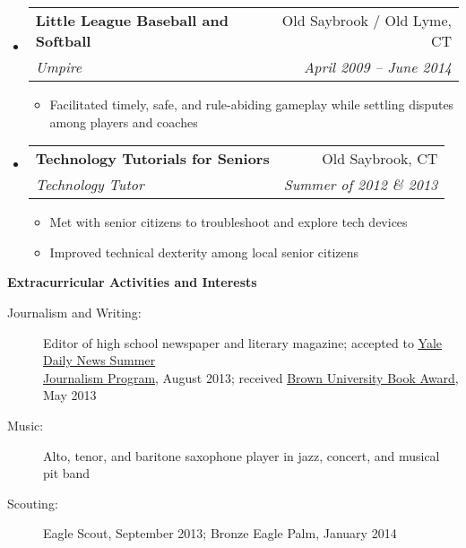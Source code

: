 \documentclass[letterpaper,10.6pt]{article}
\makeatletter
\newcommand{\resitem}[1]{\item #1 \vspace{-2pt}}
\newcommand{\resheading}[1]{{\large \colorbox{mygrey}{\begin{minipage}{\textwidth}{\textbf{#1 \vphantom{p\^{E}}}}\end{minipage}}}}
\newcommand{\ressubheading}[4]{
\begin{tabular*}{6.8in}{l@{\extracolsep{\fill}}r}
		\textbf{#1} & #2 \\
		\emph{#3} & \emph{#4} \\
\end{tabular*}\vspace{-6pt}}
\makeatother
\begin{document}
\begin{itemize}[leftmargin=*]
		\item[]
		\ressubheading{Little League Baseball and Softball}{Old Saybrook / Old Lyme, CT}
		{Umpire}{April 2009 -- June 2014}
		{\footnotesize
			\begin{itemize}
				\resitem{Facilitated timely, safe, and rule-abiding gameplay while settling disputes among players and coaches}
			\end{itemize}}
		\item[]
			\ressubheading{Technology Tutorials for Seniors}{Old Saybrook, CT}
				{Technology Tutor}{Summer of 2012 \& 2013}
				{\footnotesize 
				\begin{itemize}
					\resitem{Met with senior citizens to troubleshoot and explore tech devices}
					\resitem{Improved technical dexterity among local senior citizens}
				\end{itemize}}
	\end{itemize}  %

\resheading{Extracurricular Activities and Interests}
	\begin{description}
		\item[Journalism and Writing:] { \footnotesize Editor of high school newspaper and literary magazine; accepted to \href{http://yaledailynews.com/about-us/sjp/}{Yale Daily News Summer \\ \hspace{3.6cm}Journalism Program}, August 2013; received \href{http://www.brown.edu/campus-life/support/bookstore/book-award}{Brown University Book Award}, May 2013}
		\item[Music:] {\footnotesize Alto, tenor, and baritone saxophone player in jazz, concert, and musical pit band}
		\item[Scouting:] {\footnotesize Eagle Scout, September 2013; Bronze Eagle Palm, January 2014}
		
	\end{description} %
	
\end{document}
